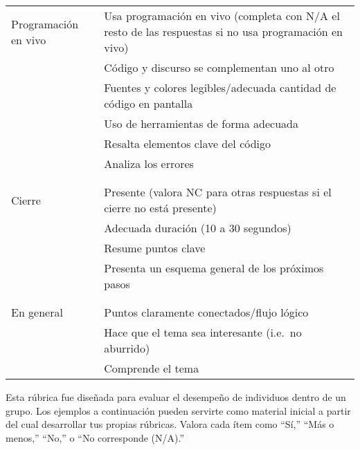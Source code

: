 \begin{longtable}{p{}p{}}
  Programación en vivo
  & Usa programación en vivo (completa con N/A el resto de las respuestas si no usa programación en vivo) \\
  & Código y discurso se complementan uno al otro\\
  & Fuentes y colores legibles/adecuada cantidad de código en pantalla \\
  & Uso de herramientas de forma adecuada \\
  & Resalta elementos clave del código \\
  & Analiza los errores \\
  \\ [-1.5ex] \hline \\ [-1.5ex]

  Cierre
  & Presente (valora NC para otras respuestas si el cierre no está presente) \\
  & Adecuada duración (10 a 30 segundos) \\
  & Resume puntos clave \\
  & Presenta un esquema general de los próximos pasos \\
  \\ [-1.5ex] \hline \\ [-1.5ex]

  En general
  & Puntos claramente conectados/flujo lógico \\
  & Hace que el tema sea interesante (i.e.\ no aburrido) \\
  & Comprende el tema \\

\end{longtable}


Esta rúbrica fue diseñada para evaluar el desempeño de individuos dentro de un grupo. 
Los ejemplos a continuación pueden servirte como material inicial a partir del cual desarrollar tus propias rúbricas. 
Valora cada ítem como ``Sí,'' ``Más o menos,'' ``No,'' o ``No corresponde (N/A).''

